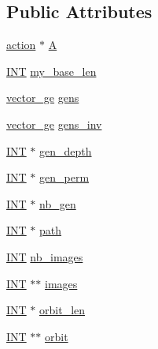 \subsection*{Public Attributes}
\begin{DoxyCompactItemize}
\item 
\mbox{\hyperlink{classaction}{action}} $\ast$ \mbox{\hyperlink{classsims_a3311c97dc08837220191985b1c7ee73f}{A}}
\item 
\mbox{\hyperlink{galois_8h_a09fddde158a3a20bd2dcadb609de11dc}{I\+NT}} \mbox{\hyperlink{classsims_a7495cb739606c584f678924d603e0c94}{my\+\_\+base\+\_\+len}}
\item 
\mbox{\hyperlink{classvector__ge}{vector\+\_\+ge}} \mbox{\hyperlink{classsims_ac1db131c547341a79a8955526bf8cdf6}{gens}}
\item 
\mbox{\hyperlink{classvector__ge}{vector\+\_\+ge}} \mbox{\hyperlink{classsims_a41d51199993a167db302ab9d1a7253cb}{gens\+\_\+inv}}
\item 
\mbox{\hyperlink{galois_8h_a09fddde158a3a20bd2dcadb609de11dc}{I\+NT}} $\ast$ \mbox{\hyperlink{classsims_ad8fc021408c0dacd697f8bd9ea647456}{gen\+\_\+depth}}
\item 
\mbox{\hyperlink{galois_8h_a09fddde158a3a20bd2dcadb609de11dc}{I\+NT}} $\ast$ \mbox{\hyperlink{classsims_a411c00c78023dd47f7dc3324ff21a6a4}{gen\+\_\+perm}}
\item 
\mbox{\hyperlink{galois_8h_a09fddde158a3a20bd2dcadb609de11dc}{I\+NT}} $\ast$ \mbox{\hyperlink{classsims_a9adf5e45bd4cd2a32df14e1d756535d0}{nb\+\_\+gen}}
\item 
\mbox{\hyperlink{galois_8h_a09fddde158a3a20bd2dcadb609de11dc}{I\+NT}} $\ast$ \mbox{\hyperlink{classsims_a335f7f86ddd03bce4f414c53120e38e6}{path}}
\item 
\mbox{\hyperlink{galois_8h_a09fddde158a3a20bd2dcadb609de11dc}{I\+NT}} \mbox{\hyperlink{classsims_af6b4c88343d7529f126a8256cdaeb8fe}{nb\+\_\+images}}
\item 
\mbox{\hyperlink{galois_8h_a09fddde158a3a20bd2dcadb609de11dc}{I\+NT}} $\ast$$\ast$ \mbox{\hyperlink{classsims_a1aca76aefaabba3ac26c1fa36403ac55}{images}}
\item 
\mbox{\hyperlink{galois_8h_a09fddde158a3a20bd2dcadb609de11dc}{I\+NT}} $\ast$ \mbox{\hyperlink{classsims_a63f4bc56c6b99fbcfaaa66e5d4beb0ad}{orbit\+\_\+len}}
\item 
\mbox{\hyperlink{galois_8h_a09fddde158a3a20bd2dcadb609de11dc}{I\+NT}} $\ast$$\ast$ \mbox{\hyperlink{classsims_afec20a4a686695d3df964733f905a3c7}{orbit}}
\item 

\end{DoxyCompactItemize}
